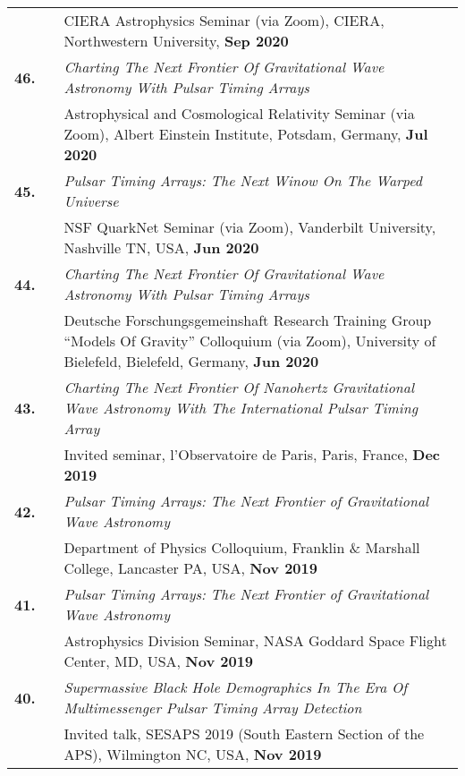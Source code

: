 \documentclass[11pt,letterpaper,sans]{moderncv}
\begin{document}
{\begin{longtable}{rp{0.3cm}p{15.8cm}}
&& CIERA Astrophysics Seminar (via Zoom), CIERA, Northwestern University, \textbf{Sep 2020} \vspace{0.09cm}\\
\textbf{46.} & & \textit{Charting The Next Frontier Of Gravitational Wave Astronomy With Pulsar Timing Arrays} \\
&& Astrophysical and Cosmological Relativity Seminar (via Zoom), Albert Einstein Institute, Potsdam, Germany, \textbf{Jul 2020} \vspace{0.09cm}\\
\textbf{45.} & & \textit{Pulsar Timing Arrays: The Next Winow On The Warped Universe} \\
&& NSF QuarkNet Seminar (via Zoom), Vanderbilt University, Nashville TN, USA, \textbf{Jun 2020} \vspace{0.09cm}\\
\textbf{44.} & & \textit{Charting The Next Frontier Of Gravitational Wave Astronomy With Pulsar Timing Arrays} \\
&& Deutsche Forschungsgemeinshaft Research Training Group ``Models Of Gravity'' Colloquium (via Zoom), University of Bielefeld, Bielefeld, Germany, \textbf{Jun 2020} \vspace{0.09cm}\\
\textbf{43.} & & \textit{Charting The Next Frontier Of Nanohertz Gravitational Wave Astronomy With The International Pulsar Timing Array} \\
&& Invited seminar, l'Observatoire de Paris, Paris, France, \textbf{Dec 2019} \vspace{0.09cm}\\
\textbf{42.} & & \textit{Pulsar Timing Arrays: The Next Frontier of Gravitational Wave Astronomy} \\
&& Department of Physics Colloquium, Franklin \& Marshall College, Lancaster PA, USA, \textbf{Nov 2019} \vspace{0.09cm}\\
\textbf{41.} & & \textit{Pulsar Timing Arrays: The Next Frontier of Gravitational Wave Astronomy} \\
&& Astrophysics Division Seminar, NASA Goddard Space Flight Center, MD, USA, \textbf{Nov 2019} \vspace{0.09cm}\\
\textbf{40.} & & \textit{Supermassive Black Hole Demographics In The Era Of Multimessenger Pulsar Timing Array Detection} \\
&& Invited talk, SESAPS 2019 (South Eastern Section of the APS), Wilmington NC, USA, \textbf{Nov 2019} \vspace{0.09cm}\\

\end{longtable}}
\end{document}
